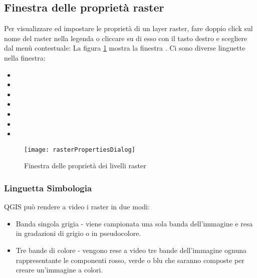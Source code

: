 \subsection{Finestra delle proprietà raster}\label{label_rasterprop}

Per visualizzare ed impostare le proprietà di un layer raster, fare doppio
click sul nome del raster nella legenda o cliccare su di esso con il tasto
destro e scegliere  dal menù contestuale:
La figura \ref{fig:raster_properties} mostra la finestra . 
Ci sono diverse linguette nella finestra: 

\begin{itemize}
 \item {}
 \item {}
 \item {}
 \item {}
 \item {}
 \item {}
 \item {}
\end{itemize}

\begin{figure}[h]
  \begin{center}
   \caption{Finestra delle proprietà dei livelli raster \nixcaption}\label{fig:raster_properties}\smallskip
   \texttt{[image: rasterPropertiesDialog]}
\end{center}  
\end{figure}

\subsubsection{Linguetta Simbologia}\label{label_sombology}

QGIS può rendere a video i raster in due modi:

\begin{itemize}
\item Banda singola grigia - viene campionata una sola banda dell'immagine e
resa in gradazioni di grigio o in pseudocolore.
\item Tre bande di colore - vengono rese a video tre bande dell'immagine
ognuna rappresentante le componenti rosso, verde o blu che saranno composte
per creare un'immagine a colori.
\end{itemize}


